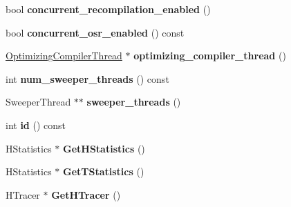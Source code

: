 \begin{DoxyCompactItemize}
\item 
\hypertarget{classv8_1_1internal_1_1_isolate_ad2b367fff0549b42f75e6390d1729d68}{}bool {\bfseries concurrent\+\_\+recompilation\+\_\+enabled} ()\label{classv8_1_1internal_1_1_isolate_ad2b367fff0549b42f75e6390d1729d68}

\item 
\hypertarget{classv8_1_1internal_1_1_isolate_a670a4d19fd963abc4aa8b025ce60b166}{}bool {\bfseries concurrent\+\_\+osr\+\_\+enabled} () const \label{classv8_1_1internal_1_1_isolate_a670a4d19fd963abc4aa8b025ce60b166}

\item 
\hypertarget{classv8_1_1internal_1_1_isolate_aa26876126f1ab7d2aa964ac0eb334afe}{}\hyperlink{classv8_1_1internal_1_1_optimizing_compiler_thread}{Optimizing\+Compiler\+Thread} $\ast$ {\bfseries optimizing\+\_\+compiler\+\_\+thread} ()\label{classv8_1_1internal_1_1_isolate_aa26876126f1ab7d2aa964ac0eb334afe}

\item 
\hypertarget{classv8_1_1internal_1_1_isolate_a6c3a34efbf5c16d053b615d801613546}{}int {\bfseries num\+\_\+sweeper\+\_\+threads} () const \label{classv8_1_1internal_1_1_isolate_a6c3a34efbf5c16d053b615d801613546}

\item 
\hypertarget{classv8_1_1internal_1_1_isolate_af830944d7c4299722c113c38bc68f61f}{}Sweeper\+Thread $\ast$$\ast$ {\bfseries sweeper\+\_\+threads} ()\label{classv8_1_1internal_1_1_isolate_af830944d7c4299722c113c38bc68f61f}

\item 
\hypertarget{classv8_1_1internal_1_1_isolate_a6b9bfb2f48c9f9d8b76a127ee6664da8}{}int {\bfseries id} () const \label{classv8_1_1internal_1_1_isolate_a6b9bfb2f48c9f9d8b76a127ee6664da8}

\item 
\hypertarget{classv8_1_1internal_1_1_isolate_aadcfeeb09af677d9b2fcee360bfa3255}{}H\+Statistics $\ast$ {\bfseries Get\+H\+Statistics} ()\label{classv8_1_1internal_1_1_isolate_aadcfeeb09af677d9b2fcee360bfa3255}

\item 
\hypertarget{classv8_1_1internal_1_1_isolate_a7ac782ca3fe1854b1348c9078870e150}{}H\+Statistics $\ast$ {\bfseries Get\+T\+Statistics} ()\label{classv8_1_1internal_1_1_isolate_a7ac782ca3fe1854b1348c9078870e150}

\item 
\hypertarget{classv8_1_1internal_1_1_isolate_a83e239c42a0eb2c6ce424d38a51580f3}{}H\+Tracer $\ast$ {\bfseries Get\+H\+Tracer} ()\label{classv8_1_1internal_1_1_isolate_a83e239c42a0eb2c6ce424d38a51580f3}


\end{DoxyCompactItemize}
